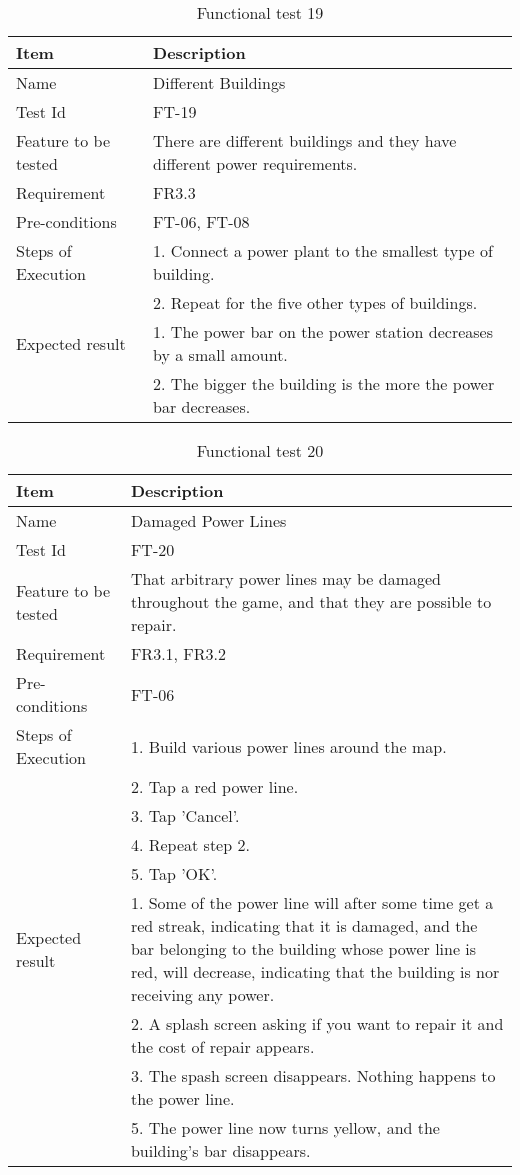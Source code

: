 \begin{table}[H]
\centering
	\begin{tabular}{ l | p{8cm} }
		\hline
		{\bf Item} & {\bf Description} \\ \hline
		Name & Different Buildings \\ 
		Test Id & FT-19 \\ 
		Feature to be tested & There are different buildings and they have different power requirements. \\ 
		Requirement & FR3.3 \\ 
		Pre-conditions & FT-06, FT-08 \\ 
		Steps of Execution & 1. Connect a power plant to the smallest type of building. \\
		& 2. Repeat for the five other types of buildings. \\
		Expected result & 1. The power bar on the power station decreases by a small amount. \\
		& 2. The bigger the building is the more the power bar decreases. \\
	\end{tabular}
	\caption{Functional test 19}
\end{table}

\begin{table}[H]
\centering
	\begin{tabular}{ l | p{8cm} }
		\hline
		{\bf Item} & {\bf Description} \\ \hline
		Name & Damaged Power Lines \\ 
		Test Id & FT-20 \\ 
		Feature to be tested & That arbitrary power lines may be damaged throughout the game, and that they are possible to repair. \\ 
		Requirement & FR3.1, FR3.2  \\ 
		Pre-conditions & FT-06 \\ 
		Steps of Execution & 1. Build various power lines around the map. \\ 
		& 2. Tap a red power line. \\
		& 3. Tap 'Cancel'. \\
		& 4. Repeat step 2. \\
		& 5. Tap 'OK'. \\
		Expected result & 1. Some of the power line will after some time get a red streak, indicating that it is damaged, and the bar belonging to the building whose power line is red, will decrease, indicating that the building is nor receiving any power. \\
		& 2. A splash screen asking if you want to repair it and the cost of repair appears. \\
		& 3. The spash screen disappears. Nothing happens to the power line. \\
		& 5. The power line now turns yellow, and the building's bar disappears. \\
	\end{tabular}
	\caption{Functional test 20}
\end{table}

